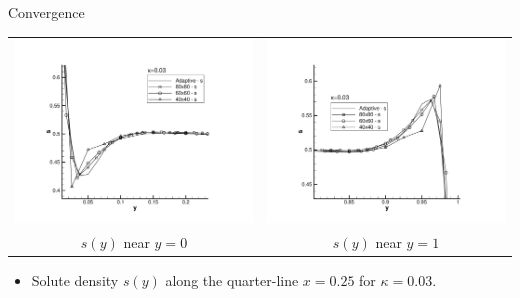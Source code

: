 \documentclass[compress,12pt]{beamer}
\begin{document}
\begin{frame}{Convergence}
  \begin{center}
    \begin{tabular}{cc} \\
      \includegraphics[viewport=124 40 670 550,clip=true,width=.5\textwidth]{figures/s_x_equal_0_point_25_zoom_0}&
      \includegraphics[viewport=124 40 670 550,clip=true,width=.5\textwidth]{figures/s_x_equal_0_point_25_zoom_1}\\
      $s(y)$ near $y=0$ &
      $s(y)$ near $y=1$ 
    \end{tabular}
    \begin{itemize}
    \item Solute density $s(y)$ along the quarter-line $x=0.25$ for $\kappa=0.03$.
    \end{itemize}
  \end{center}    
\end{frame}
\end{document}
